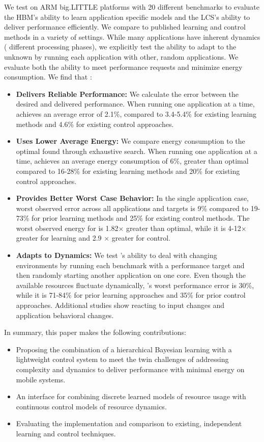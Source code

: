 We test \SYSTEM{} on ARM big.LITTLE platforms with 20 different
benchmarks to evaluate the HBM's ability to learn application specific
models and the LCS's ability to deliver performance efficiently.  We
compare to published learning and control methods in a variety of
settings.  While many applications have inherent dynamics (\ie
different processing phases), we explicitly test the ability to adapt
to the unknown by running each application with other, random
applications.  We evaluate both the ability to meet performance
requests and minimize energy consumption.  We find that \SYSTEM{}:
\begin{itemize}
\item \textbf{Delivers Reliable Performance: } We calculate the error
  between the desired and delivered performance.  When running one
  application at a time, \SYSTEM{} achieves an average error of 2.1\%,
  compared to 3.4-5.4\% for existing learning methods and 4.6\% for
  existing control approaches.
\item \textbf{Uses Lower Average Energy:} We compare energy
  consumption to the optimal found through exhaustive search.  When
  running one application at a time, \SYSTEM{} achieves an average
  energy consumption of 6\%, greater than optimal compared to 16-28\%
  for existing learning methods and 20\% for existing control
  approaches.
\item \textbf{Provides Better Worst Case Behavior:} In the single
  application case, \SYSTEM{} worst observed error across all
  applications and targets is 9\% compared to 19-73\% for prior
  learning methods and 25\% for existing control methods.  The worst
  observed energy for \SYSTEM{} is 1.82$\times$ greater than optimal,
  while it is 4-12$\times$ greater for learning and 2.9 $\times$
  greater for control.
\item \textbf{Adapts to Dynamics:} We test \SYSTEM{}'s ability to deal
  with changing environments by running each benchmark with a
  performance target and then randomly starting another application on
  one core.  Even though the available resources fluctuate
  dynamically, \SYSTEM{}'s worst performance error is 30\%, while it
  is 71-84\% for prior learning approaches and 35\% for prior control
  approaches.  Additional studies show \SYSTEM{} reacting to input
  changes and application behavioral changes.
\end{itemize}
In summary, this paper makes the following contributions:
\begin{itemize}
\item Proposing the combination of a hierarchical Bayesian learning
  with a lightweight control system to meet the twin challenges of
  addressing complexity and dynamics to deliver performance with
  minimal energy on mobile systems.
\item An interface for combining discrete learned models of resource
  usage with continuous control models of resource dynamics.
\item Evaluating the implementation and comparison to existing,
  independent learning and control techniques.
\end{itemize}


